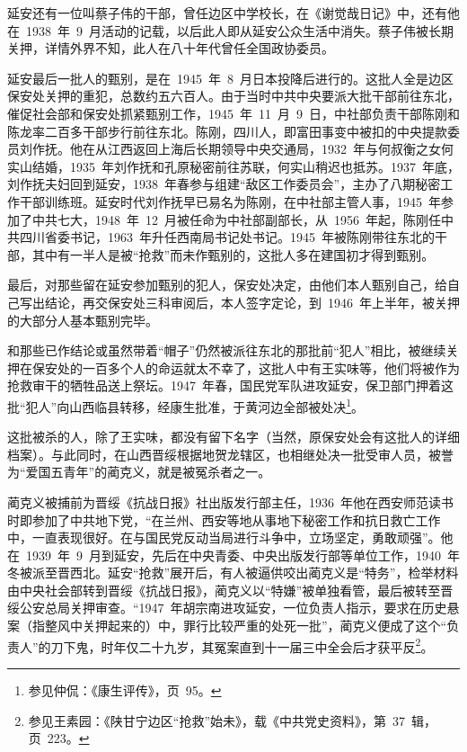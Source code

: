 延安还有一位叫蔡子伟的干部，曾任边区中学校长，在《谢觉哉日记》中，还有他在~1938~年~9~月活动的记载，以后此人即从延安公众生活中消失。蔡子伟被长期关押，详情外界不知，此人在八十年代曾任全国政协委员。

延安最后一批人的甄别，是在~1945~年~8~月日本投降后进行的。这批人全是边区保安处关押的重犯，总数约五六百人。由于当时中共中央要派大批干部前往东北，催促社会部和保安处抓紧甄别工作，1945~年~11~月~9~日，中社部负责干部陈刚和陈龙率二百多干部步行前往东北。陈刚，四川人，即富田事变中被扣的中央提款委员刘作抚。他在从江西返回上海后长期领导中央交通局，1932~年与何叔衡之女何实山结婚，1935~年刘作抚和孔原秘密前往苏联，何实山稍迟也抵苏。1937~年底，刘作抚夫妇回到延安，1938~年春参与组建“敌区工作委员会”，主办了八期秘密工作干部训练班。延安时代刘作抚早已易名为陈刚，在中社部主管人事，1945~年参加了中共七大，1948~年~12~月被任命为中社部副部长，从~1956~年起，陈刚任中共四川省委书记，1963~年升任西南局书记处书记。1945~年被陈刚带往东北的干部，其中有一半人是被“抢救”而未作甄别的，这批人多在建国初才得到甄别。

最后，对那些留在延安参加甄别的犯人，保安处决定，由他们本人甄别自己，给自己写出结论，再交保安处三科审阅后，本人签字定论，到~1946~年上半年，被关押的大部分人基本甄别完毕。

和那些已作结论或虽然带着“帽子”仍然被派往东北的那批前“犯人”相比，被继续关押在保安处的一百多个人的命运就太不幸了，这批人中有王实味等，他们将被作为抢救审干的牺牲品送上祭坛。1947~年春，国民党军队进攻延安，保卫部门押着这批“犯人”向山西临县转移，经康生批准，于黄河边全部被处决\footnote{参见仲侃：《康生评传》，页~95。}。

这批被杀的人，除了王实味，都没有留下名字（当然，原保安处会有这批人的详细档案）。与此同时，在山西晋绥根据地贺龙辖区，也相继处决一批受审人员，被誉为“爱国五青年”的蔺克义，就是被冤杀者之一。

蔺克义被捕前为晋绥《抗战日报》社出版发行部主任，1936~年他在西安师范读书时即参加了中共地下党，“在兰州、西安等地从事地下秘密工作和抗日救亡工作中，一直表现很好。在与国民党反动当局进行斗争中，立场坚定，勇敢顽强”。他在~1939~年~9~月到延安，先后在中央青委、中央出版发行部等单位工作，1940~年冬被派至晋西北。延安“抢救”展开后，有人被逼供咬出蔺克义是“特务”，检举材料由中央社会部转到晋绥《抗战日报》，蔺克义以“特嫌”被单独看管，最后被转至晋绥公安总局关押审查。“1947~年胡宗南进攻延安，一位负责人指示，要求在历史悬案（指整风中关押起来的）中，罪行比较严重的处死一批”，蔺克义便成了这个“负责人”的刀下鬼，时年仅二十九岁，其冤案直到十一届三中全会后才获平反\footnote{参见王素园：《陕甘宁边区“抢救”始未》，载《中共党史资料》，第~37~辑，页~223。}。

